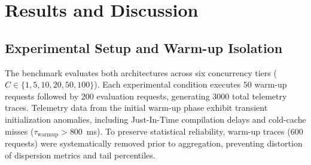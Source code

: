 \documentclass[conference]{IEEEtran}
\begin{document}
\section{Results and Discussion}
\label{sec:results}

\subsection{Experimental Setup and Warm-up Isolation}
The benchmark evaluates both architectures across six concurrency tiers ($C \in \{1, 5, 10, 20, 50, 100\}$). Each experimental condition executes $50$ warm-up requests followed by $200$ evaluation requests, generating $3000$ total telemetry traces. Telemetry data from the initial warm-up phase exhibit transient initialization anomalies, including Just-In-Time compilation delays and cold-cache misses ($\tau_{\text{warmup}} > 800$~ms). To preserve statistical reliability, warm-up traces ($600$ requests) were systematically removed prior to aggregation, preventing distortion of dispersion metrics and tail percentiles.
\end{document}
